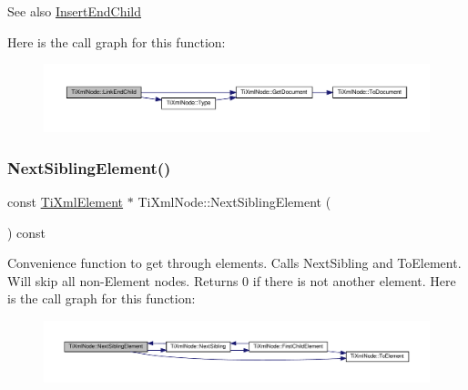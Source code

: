\begin{DoxySeeAlso}{See also}
\hyperlink{classTiXmlNode_af287a913ce46d8dbf7ef24fec69bbaf0}{Insert\+End\+Child} 
\end{DoxySeeAlso}
Here is the call graph for this function\+:
\nopagebreak
\begin{figure}[H]
\begin{center}
\leavevmode
\includegraphics[width=350pt]{classTiXmlNode_a1a881212554b759865f6cac79a851d38_cgraph}
\end{center}
\end{figure}
\mbox{\label{classTiXmlNode_ac6105781c913a42aa7f3f17bd1964f7c}} 
\subsubsection{\texorpdfstring{Next\+Sibling\+Element()}{NextSiblingElement()}\hspace{0.1cm}{\footnotesize\ttfamily [1/2]}}
{\footnotesize\ttfamily const \hyperlink{classTiXmlElement}{Ti\+Xml\+Element} $\ast$ Ti\+Xml\+Node\+::\+Next\+Sibling\+Element (\begin{DoxyParamCaption}{ }\end{DoxyParamCaption}) const}

Convenience function to get through elements. Calls Next\+Sibling and To\+Element. Will skip all non-\/\+Element nodes. Returns 0 if there is not another element. Here is the call graph for this function\+:
\nopagebreak
\begin{figure}[H]
\begin{center}
\leavevmode
\includegraphics[width=350pt]{classTiXmlNode_ac6105781c913a42aa7f3f17bd1964f7c_cgraph}
\end{center}
\end{figure}
\mbox{\label{classTiXmlNode_a22def4746238abaee042f99b47ef3c94}} 
